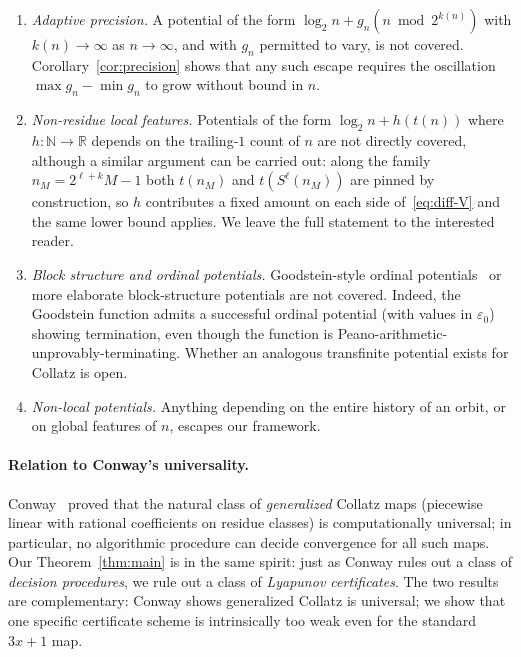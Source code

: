 \documentclass[11pt,a4paper]{article}
\theoremstyle{definition}
\theoremstyle{remark}
\newcommand{\N}{\mathbb{N}}
\newcommand{\R}{\mathbb{R}}
\begin{document}
\begin{enumerate}[label=(\arabic*),leftmargin=2em]
  \item \emph{Adaptive precision.}  A potential of the form
    $\log_2 n + g_n(n \bmod 2^{k(n)})$ with $k(n) \to \infty$ as
    $n \to \infty$, and with $g_n$ permitted to vary, is not covered.
    Corollary~\ref{cor:precision} shows that any such escape requires
    the oscillation $\max g_n - \min g_n$ to grow without bound in $n$.
  \item \emph{Non-residue local features.}  Potentials of the form
    $\log_2 n + h(t(n))$ where $h \colon \N \to \R$ depends on the
    trailing-$1$ count of $n$ are not directly covered, although a
    similar argument can be carried out: along the family
    $n_M = 2^{\ell + k} M - 1$ both $t(n_M)$ and $t(S^\ell(n_M))$ are
    pinned by construction, so $h$ contributes a fixed amount on each
    side of~\eqref{eq:diff-V} and the same lower bound applies.  We
    leave the full statement to the interested reader.
  \item \emph{Block structure and ordinal potentials.}  Goodstein-style
    ordinal potentials~\cite{KirbyParis1982} or more elaborate
    block-structure potentials are not covered.  Indeed, the Goodstein
    function admits a successful ordinal potential (with values in
    $\varepsilon_0$) showing termination, even though the function is
    Peano-arithmetic-unprovably-terminating.  Whether an analogous
    transfinite potential exists for Collatz is open.
  \item \emph{Non-local potentials.}  Anything depending on the entire
    history of an orbit, or on global features of $n$, escapes our
    framework.
\end{enumerate}

\paragraph{Relation to Conway's universality.}
Conway~\cite{Conway1972} proved that the natural class of
\emph{generalized} Collatz maps (piecewise linear with rational
coefficients on residue classes) is computationally universal; in
particular, no algorithmic procedure can decide convergence for all
such maps.  Our Theorem~\ref{thm:main} is in the same spirit: just as
Conway rules out a class of \emph{decision procedures}, we rule out a
class of \emph{Lyapunov certificates}.  The two results are
complementary: Conway shows generalized Collatz is universal; we show
that one specific certificate scheme is intrinsically too weak even
for the standard $3x+1$ map.
\end{document}
